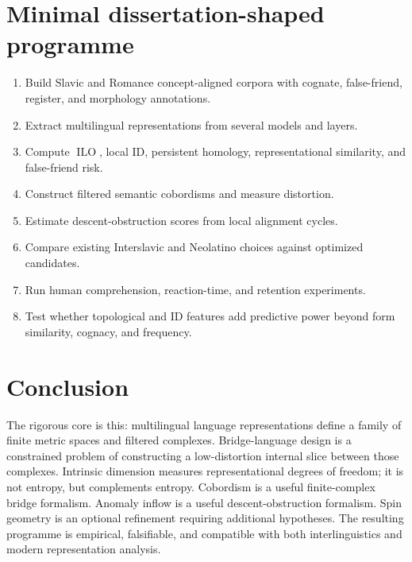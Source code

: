 \documentclass[11pt]{article}
\newcommand{\ILO}{\operatorname{ILO}}
\begin{document}
\section{Minimal dissertation-shaped programme}

\begin{enumerate}[leftmargin=*]
  \item Build Slavic and Romance concept-aligned corpora with cognate, false-friend, register, and morphology annotations.
  \item Extract multilingual representations from several models and layers.
  \item Compute $\ILO$, local ID, persistent homology, representational similarity, and false-friend risk.
  \item Construct filtered semantic cobordisms and measure distortion.
  \item Estimate descent-obstruction scores from local alignment cycles.
  \item Compare existing Interslavic and Neolatino choices against optimized candidates.
  \item Run human comprehension, reaction-time, and retention experiments.
  \item Test whether topological and ID features add predictive power beyond form similarity, cognacy, and frequency.
\end{enumerate}

\section{Conclusion}

The rigorous core is this: multilingual language representations define a family of finite metric spaces and filtered complexes.  Bridge-language design is a constrained problem of constructing a low-distortion internal slice between those complexes.  Intrinsic dimension measures representational degrees of freedom; it is not entropy, but complements entropy.  Cobordism is a useful finite-complex bridge formalism.  Anomaly inflow is a useful descent-obstruction formalism.  Spin geometry is an optional refinement requiring additional hypotheses.  The resulting programme is empirical, falsifiable, and compatible with both interlinguistics and modern representation analysis.
\end{document}
